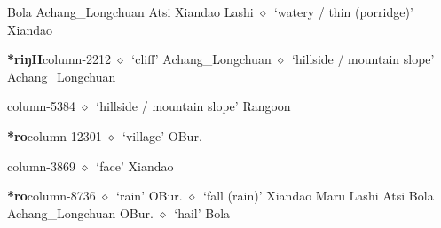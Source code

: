          Bola 
\hspace{1ex}
         Achang\_Longchuan 
\hspace{1ex}
         Atsi 
\hspace{1ex}
         Xiandao 
\hspace{1ex}
         Lashi 
\hspace{1ex}
         $\diamond$~`watery / thin (porridge)'
         Xiandao 
  \item {\footnotesize \textbf{*riŋH}}{\tiny column-2212}
         $\diamond$~`cliff'
         Achang\_Longchuan 
\hspace{1ex}
         $\diamond$~`hillside / mountain slope'
         Achang\_Longchuan 
  \item {\footnotesize \textbf{}}{\tiny column-5384}
         $\diamond$~`hillside / mountain slope'
         Rangoon 
  \item {\footnotesize \textbf{*ro}}{\tiny column-12301}
         $\diamond$~`village'
         OBur. 
  \item {\footnotesize \textbf{}}{\tiny column-3869}
         $\diamond$~`face'
         Xiandao 
  \item {\footnotesize \textbf{*ro}}{\tiny column-8736}
         $\diamond$~`rain'
         OBur. 
\hspace{1ex}
         $\diamond$~`fall (rain)'
         Xiandao 
\hspace{1ex}
         Maru 
\hspace{1ex}
         Lashi 
\hspace{1ex}
         Atsi 
\hspace{1ex}
         Bola 
\hspace{1ex}
         Achang\_Longchuan 
\hspace{1ex}
         OBur. 
\hspace{1ex}
         $\diamond$~`hail'
         Bola 
